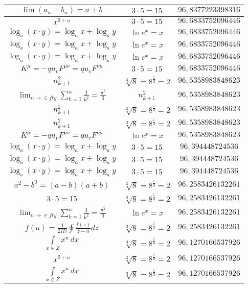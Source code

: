 \documentclass{article}
\begin{document}
\begin{flushleft}
\begin{longtable}{|c|c|c|}
$\lim\left(a_n+b_n\right)=a+b$ & $3\cdot 5=15$ & $96,8377223398316$ \\ \hline 
$x^{2+a}$ & $3\cdot 5=15$ & $96,6833752096446$ \\ \hline 
$\log_{a}(x\cdot y)=\log_{a}x+\log_{a}y$ & $\ln e^x=x$ & $96,6833752096446$ \\ \hline 
$\log_{a}(x\cdot y)=\log_{a}x+\log_{a}y$ & $\ln e^x=x$ & $96,6833752096446$ \\ \hline 
$\log_{a}(x\cdot y)=\log_{a}x+\log_{a}y$ & $\ln e^x=x$ & $96,6833752096446$ \\ \hline 
$K^\mu=-qu_vF^{\mu\nu}=qu_vF^{\nu\mu}$ & $3\cdot 5=15$ & $96,6833752096446$ \\ \hline 
$n_{k+1}^2$ & $\sqrt[3]{8}=8^{\frac{1}{3}}=2$ & $96,5358983848623$ \\ \hline 
$\lim_{n\to\in fty}\sum_{k=1}^n\frac{1}{k^2}=\frac{\pi^2}{6}$ & $n_{k+1}^2$ & $96,5358983848623$ \\ \hline 
$n_{k+1}^2$ & $\sqrt[3]{8}=8^{\frac{1}{3}}=2$ & $96,5358983848623$ \\ \hline 
$n_{k+1}^2$ & $\sqrt[3]{8}=8^{\frac{1}{3}}=2$ & $96,5358983848623$ \\ \hline 
$K^\mu=-qu_vF^{\mu\nu}=qu_vF^{\nu\mu}$ & $\ln e^x=x$ & $96,5358983848623$ \\ \hline 
$\log_{a}(x\cdot y)=\log_{a}x+\log_{a}y$ & $3\cdot 5=15$ & $96,394448724536$ \\ \hline 
$\log_{a}(x\cdot y)=\log_{a}x+\log_{a}y$ & $3\cdot 5=15$ & $96,394448724536$ \\ \hline 
$\log_{a}(x\cdot y)=\log_{a}x+\log_{a}y$ & $3\cdot 5=15$ & $96,394448724536$ \\ \hline 
$a^2-b^2=(a-b)(a+b)$ & $\sqrt[3]{8}=8^{\frac{1}{3}}=2$ & $96,2583426132261$ \\ \hline 
$3\cdot 5=15$ & $\sqrt[3]{8}=8^{\frac{1}{3}}=2$ & $96,2583426132261$ \\ \hline 
$\lim_{n\to\in fty}\sum_{k=1}^n\frac{1}{k^2}=\frac{\pi^2}{6}$ & $\ln e^x=x$ & $96,2583426132261$ \\ \hline 
$f\left(a\right)=\frac{1}{2\Pi i}\oint\frac{f\left(z\right)}{z-a}dz$ & $\sqrt[3]{8}=8^{\frac{1}{3}}=2$ & $96,2583426132261$ \\ \hline 
$\int \limits_{x\in Z}\!x^{n}\,dx$ & $\sqrt[3]{8}=8^{\frac{1}{3}}=2$ & $96,1270166537926$ \\ \hline 
$x^{2+a}$ & $\sqrt[3]{8}=8^{\frac{1}{3}}=2$ & $96,1270166537926$ \\ \hline 
$\int \limits_{x\in Z}\!x^{n}\,dx$ & $\sqrt[3]{8}=8^{\frac{1}{3}}=2$ & $96,1270166537926$ \\ \hline 

\end{longtable}
\end{flushleft}
\end{document}
